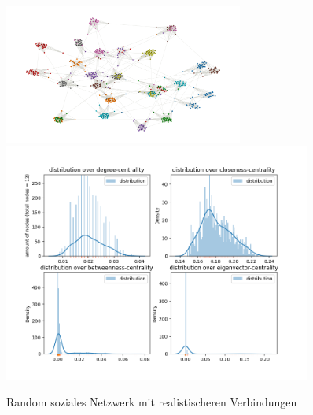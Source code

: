 \FloatBarrier
\begin{figure}[h!]%
  \centering
  \includegraphics[width=0.7\textwidth]{Graphics/newourSN.png}
  \includegraphics[width=0.9\textwidth]{Graphics/newOurDist.png}
  \caption{Random soziales Netzwerk mit realistischeren Verbindungen}
  \label{fig:distributionALL}
\end{figure}
\FloatBarrier
